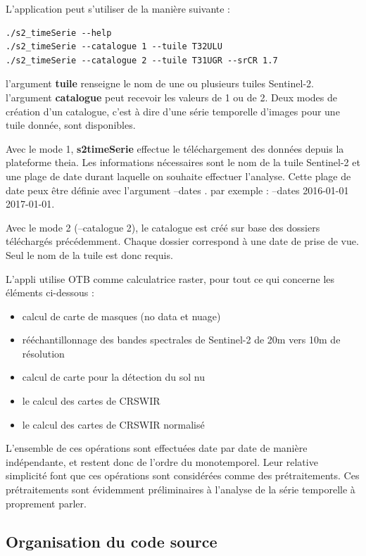 \documentclass[a4paper, 12pt]{article} %
\begin{document}
L'application peut s'utiliser de la manière suivante :

\begin{lstlisting}
./s2_timeSerie --help
./s2_timeSerie --catalogue 1 --tuile T32ULU 
./s2_timeSerie --catalogue 2 --tuile T31UGR --srCR 1.7
\end{lstlisting}

l'argument \textbf{tuile} renseigne le nom de une ou plusieurs tuiles Sentinel-2.
l'argument \textbf{catalogue} peut recevoir les valeurs de 1 ou de 2. Deux modes de création d'un catalogue, c'est à dire d'une série temporelle d'images pour une tuile donnée, sont disponibles.

Avec le mode 1, \textbf{s2{\textunderscore}timeSerie} effectue le téléchargement des données depuis la plateforme theia. Les informations nécessaires sont le nom de la tuile Sentinel-2 et une plage de date durant laquelle on souhaite effectuer l'analyse. Cette plage de date peux être définie avec l'argument --dates . par exemple : --dates 2016-01-01 2017-01-01.

Avec le mode 2 (--catalogue 2), le catalogue est créé sur base des dossiers téléchargés précédemment. Chaque dossier correspond à une date de prise de vue. Seul le nom de la tuile est donc requis.

L'appli utilise OTB comme calculatrice raster, pour tout ce qui concerne les éléments ci-dessous :
\begin{itemize}
	\item calcul de carte de masques (no data et nuage)
	\item rééchantillonnage des bandes spectrales de Sentinel-2 de 20m vers 10m de résolution
	\item calcul de carte pour la détection du sol nu
	\item le calcul des cartes de CRSWIR
	\item le calcul des cartes de CRSWIR normalisé
\end{itemize}

L'ensemble de ces opérations sont effectuées date par date de manière indépendante, et restent donc de l'ordre du monotemporel. Leur relative simplicité font que ces opérations sont considérées comme des prétraitements. Ces prétraitements sont évidemment préliminaires à l'analyse de la série temporelle à proprement parler.
 
\subsection{Organisation du code source}
\end{document}
